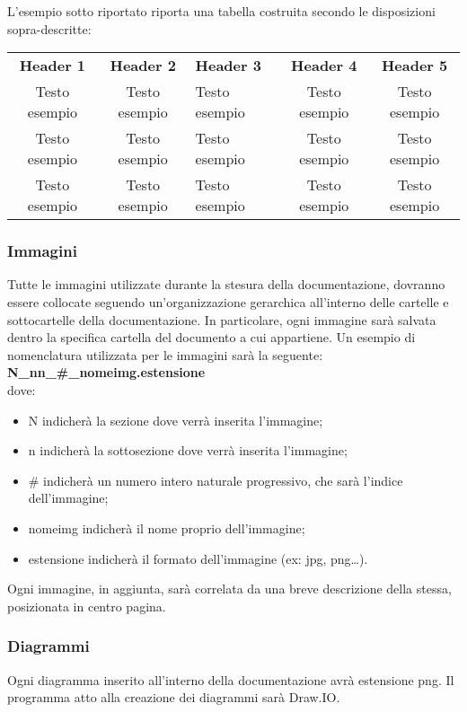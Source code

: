 L’esempio sotto riportato riporta una tabella costruita secondo le disposizioni sopra-descritte:
{
    \renewcommand{\arraystretch}{1.5}
    \centering
    \begin{longtable}{ c c  C{4cm}  c  c }
        \rowcolor{\primaryColor}
        \textcolor{\secondaryColor}{
        \textbf{Header 1}}     & \textcolor{\secondaryColor}{\textbf{Header 2}}       & \textcolor{\secondaryColor}
        {\textbf{Header 3}} & \textcolor{\secondaryColor}{\textbf{Header 4}} & \textcolor{\secondaryColor}{\textbf{Header 5}}                          \\
        Testo esempio                 & Testo esempio                                    & Testo esempio                                & Testo esempio & Testo esempio{} \\
        Testo esempio                & Testo esempio                                    & Testo esempio                                   & Testo esempio & Testo esempio{} \\
        Testo esempio                & Testo esempio                                    & Testo esempio                          & Testo esempio & Testo esempio{}    \\
    \end{longtable}
}

\subsubsection{Immagini}
Tutte le immagini utilizzate durante la stesura della documentazione, dovranno essere collocate seguendo un'organizzazione gerarchica all’interno delle cartelle e sottocartelle della documentazione. In particolare, ogni immagine sarà salvata dentro la specifica cartella del documento a cui appartiene. Un esempio di nomenclatura utilizzata per le immagini sarà la seguente:
\textbf{N\_nn\_\#\_nomeimg.estensione}\\
dove:
\begin{itemize}
	\item N indicherà la sezione dove verrà inserita l’immagine;
	\item n indicherà la sottosezione dove verrà inserita l’immagine;
	\item \# indicherà un numero intero naturale progressivo, che sarà l’indice dell’immagine;
	\item nomeimg indicherà il nome proprio dell’immagine;
	\item estensione indicherà il formato dell’immagine (ex: jpg, png…).
\end{itemize}
Ogni immagine, in aggiunta, sarà correlata da una breve descrizione della stessa, posizionata in centro pagina.

\subsubsection{Diagrammi }
Ogni diagramma  inserito all’interno della documentazione avrà estensione png. Il programma atto alla creazione dei diagrammi  sarà Draw.IO.

